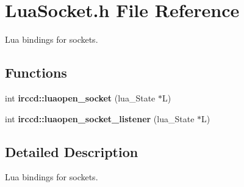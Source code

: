 \hypertarget{a00105}{\section{Lua\-Socket.\-h File Reference}
\label{a00105}
}


Lua bindings for sockets.  


\subsection*{Functions}
\begin{DoxyCompactItemize}
\item 
int {\bfseries irccd\-::luaopen\-\_\-socket} (lua\-\_\-\-State $\ast$L)
\item 
int {\bfseries irccd\-::luaopen\-\_\-socket\-\_\-listener} (lua\-\_\-\-State $\ast$L)
\end{DoxyCompactItemize}


\subsection{Detailed Description}
Lua bindings for sockets. 